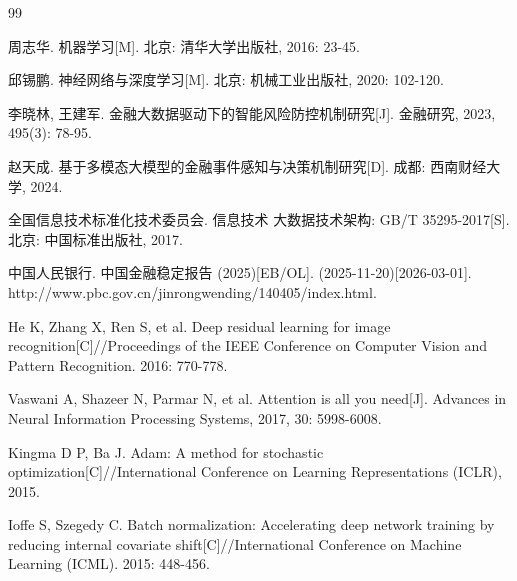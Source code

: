 

{}

\begin{thebibliography}{99}


周志华. 机器学习[M]. 北京: 清华大学出版社, 2016: 23-45.

邱锡鹏. 神经网络与深度学习[M]. 北京: 机械工业出版社, 2020: 102-120.

李晓林, 王建军. 金融大数据驱动下的智能风险防控机制研究[J]. 金融研究, 2023, 495(3): 78-95.

赵天成. 基于多模态大模型的金融事件感知与决策机制研究[D]. 成都: 西南财经大学, 2024.

全国信息技术标准化技术委员会. 信息技术 大数据技术架构: GB/T 35295-2017[S]. 北京: 中国标准出版社, 2017.

中国人民银行. 中国金融稳定报告 (2025)[EB/OL]. (2025-11-20)[2026-03-01]. http://www.pbc.gov.cn/jinrongwending/140405/index.html.


He K, Zhang X, Ren S, et al. Deep residual learning for image recognition[C]//Proceedings of the IEEE Conference on Computer Vision and Pattern Recognition. 2016: 770-778.

Vaswani A, Shazeer N, Parmar N, et al. Attention is all you need[J]. Advances in Neural Information Processing Systems, 2017, 30: 5998-6008.

Kingma D P, Ba J. Adam: A method for stochastic optimization[C]//International Conference on Learning Representations (ICLR), 2015.

Ioffe S, Szegedy C. Batch normalization: Accelerating deep network training by reducing internal covariate shift[C]//International Conference on Machine Learning (ICML). 2015: 448-456.

\end{thebibliography}
